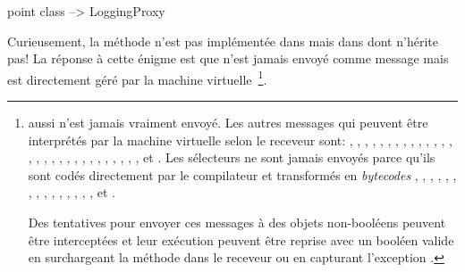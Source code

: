 \documentclass[a4paper,10pt,twoside]{book}
\begin{document}
\begin{code}{}
point class --> LoggingProxy
\end{code}
Curieusement, la méthode  n'est pas implémentée dans 
 mais dans  dont  n'hérite pas!
La réponse à cette énigme est que  n'est jamais envoyé comme message mais est directement géré par la machine virtuelle~\footnote{ aussi n'est jamais vraiment envoyé.
Les autres messages qui peuvent être interprétés par la machine virtuelle selon le receveur sont:
\mbox{\ct{+},}
\mbox{\ct{-},}
\mbox{\ct{<},}
\mbox{\ct{>},}
\mbox{\ct{<=},}
\mbox{\ct{>=},}
\mbox{\ct{=},}
\mbox{\ct{\~=},}
\mbox{\ct{*},}
\mbox{\ct{/},}
\mbox{\lct{\textbackslash},}
\mbox{\ct{==},}
\mbox{,}
\mbox{,}
\mbox{\ct{//},}
\mbox{,}
\mbox{,}
\mbox{,}
\mbox{,}
\mbox{,}
\mbox{,}
\mbox{,}
\mbox{,}
\mbox{,}
\mbox{,}
\mbox{,}
\mbox{,}
\mbox{,}
\mbox{,}
\mbox{} et \mbox{.}
Les sélecteurs ne sont jamais envoyés parce qu'ils sont codés directement par le compilateur et transformés en \emph{bytecodes} %
\mbox{,}
\mbox{,}
\mbox{,}
\mbox{,}
\mbox{,}
\mbox{,}
\mbox{,}
\mbox{,}
\mbox{,}
\mbox{}
\mbox{,}
\mbox{,}
\mbox{,}
\mbox{,}
\mbox{,}
\mbox{,}
\mbox{} et
\mbox{}.

Des tentatives pour envoyer ces messages à des objets non-booléens peuvent être interceptées et leur exécution peuvent être reprise avec un booléen valide en surchargeant la méthode  dans le receveur ou en capturant l'exception .}.
\end{document}
